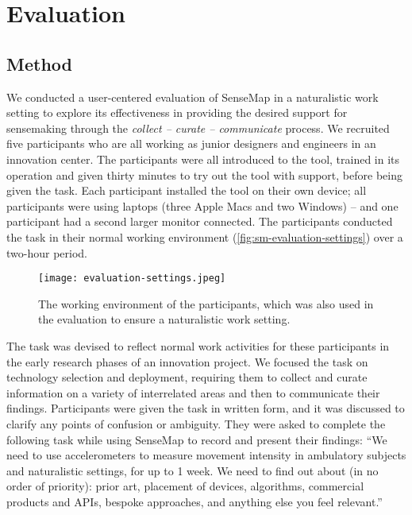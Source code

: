 \section{Evaluation}

\subsection{Method}
We conducted a user-centered evaluation of SenseMap in a naturalistic work setting to explore its effectiveness in providing the desired support for sensemaking through the \emph{collect -- curate -- communicate} process. We recruited five participants who are all working as junior designers and engineers in an innovation center. The participants were all introduced to the tool, trained in its operation and given thirty minutes to try out the tool with support, before being given the task. Each participant installed the tool on their own device; all participants were using laptops (three Apple Macs and two Windows) -- and one participant had a second larger monitor connected. The participants conducted the task in their normal working environment (\autoref{fig:sm-evaluation-settings}) over a two-hour period.

\begin{figure}[!htb]
	\centering
	\texttt{[image: evaluation-settings.jpeg]}
	\caption{The working environment of the participants, which was also used in the evaluation to ensure a naturalistic work setting.}
	\label{fig:sm-evaluation-settings}
\end{figure}

The task was devised to reflect normal work activities for these participants in the early research phases of an innovation project. We focused the task on technology selection and deployment, requiring them to collect and curate information on a variety of interrelated areas and then to communicate their findings. Participants were given the task in written form, and it was discussed to clarify any points of confusion or ambiguity. They were asked to complete the following task while using SenseMap to record and present their findings: ``We need to use accelerometers to measure movement intensity in ambulatory subjects and naturalistic settings, for up to 1 week. We need to find out about (in no order of priority): prior art, placement of devices, algorithms, commercial products and APIs, bespoke approaches, and anything else you feel relevant.''

